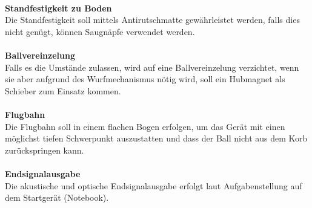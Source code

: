 	\\
	\textbf{Standfestigkeit zu Boden}\\
	Die Standfestigkeit soll mittels Antirutschmatte gewährleistet werden, falls dies nicht genügt, können Saugnäpfe verwendet werden.\\
	\\
	\textbf{Ballvereinzelung}\\
	Falls es die Umstände zulassen, wird auf eine Ballvereinzelung verzichtet, wenn sie aber aufgrund des Wurfmechanismus nötig wird, soll ein Hubmagnet als Schieber zum Einsatz kommen.\\
	\\
	\textbf{Flugbahn}\\
	Die Flugbahn soll in einem flachen Bogen erfolgen, um das Gerät mit einen möglichst tiefen Schwerpunkt auszustatten und dass der Ball nicht aus dem Korb zurückspringen kann.\\
	\\
	\textbf{Endsignalausgabe}\\
	Die akustische und optische Endsignalausgabe erfolgt laut Aufgabenstellung auf dem Startgerät (Notebook).\\
